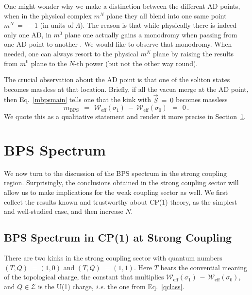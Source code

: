 \documentclass[epsfig,12pt]{article}
\def\beq{\begin{equation}}
\def\eeq{\end{equation}}
\def\beq{\begin{equation}}
\def\eeq{\end{equation}}
\newcommand{\mc}[1]{\mathcal{#1}}
\newcommand{\mbps}{m_\text{BPS}}
\newcommand{\W}{\mathcal{W}}
\begin{document}
	One might wonder why we make a distinction between the different AD points, when
	in the physical complex $ m^N $ plane they all blend into one same point $ m^N ~=~ - 1 $
	(in units of $ \Lambda $).
	The reason is that while physically there is indeed only one AD, in $ m^0 $ plane
	one actually gains a monodromy when passing from one AD point to another \cite{Dor,ls1}.
	We would like to observe that monodromy.
	When needed, one can always resort to the physical $ m^N $ plane by raising the 
	results from $ m^0 $ plane to the $ N $-th power (but not the other way round).

	The crucial observation about the AD point is that one of the soliton states becomes massless
	at that location.
	Briefly, if all the vacua merge at the AD point, then Eq.~\eqref{mbpsmain} tells one that
	the kink with $ \vec{S} ~=~ 0 $ becomes massless 
\beq
	\mbps ~~=~~ \W_\text{eff}(\sigma_1) ~-~ \W_\text{eff}(\sigma_0) ~~=~~ 0\,.
\eeq
	We quote this as a qualitative statement and render it more precise in Section~\ref{sbps}.

\section{BPS Spectrum}
\label{sbps}

	We now turn to the discussion of the BPS spectrum in the strong coupling region.
	Surprisingly, the conclusions obtained in the strong coupling sector will allow us
	to make implications for the weak coupling sector as well.
	We first collect the results known and trustworthy about CP(1) theory,
	as the simplest and well-studied case, and then increase $ N $.

\subsection{BPS Spectrum in CP(1) at Strong Coupling}

	There are two kinks in the strong coupling sector with quantum numbers
	$ (T, Q) $ $ = (1, 0) $ and $ (T, Q) $ $ = (1, 1) $.
	Here $ T $ bears the convential meaning of the topological charge, the
	constant that multiplies $ \W_\text{eff}(\sigma_1) \,-\, \W_\text{eff}(\sigma_0) $,
	and $ Q \in \mc{Z} $ is the U(1) charge, {\it i.e.} the one from Eq.~\eqref{qclass}.
\end{document}

